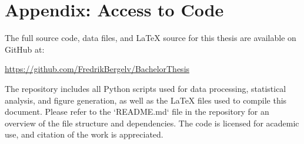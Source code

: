 \newpage
\appendix
\section{Appendix: Access to Code}
The full source code, data files, and LaTeX source for this thesis are available on GitHub at:
\begin{center}
\url{https://github.com/FredrikBergelv/BachelorThesis}
\end{center}
The repository includes all Python scripts used for data processing, statistical analysis, and figure generation, as well as the LaTeX files used to compile this document. Please refer to the `README.md` file in the repository for an overview of the file structure and dependencies. The code is licensed for academic use, and citation of the work is appreciated.




